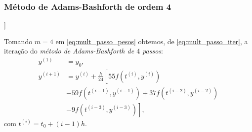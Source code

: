 \subsubsection{Método de Adams-Bashforth de ordem 4}

\begin{flushleft}
  [[tag:revisar]]
\end{flushleft}

Tomando $m=4$ em \eqref{eq:mult_passo_pesos} obtemos, de \eqref{eq:mult_passo_iter}, a iteração do \emph{método de Adams-Bashforth de $4$ passos}:
\begin{align}
  y^{(1)} &= y_0,\\
  y^{(i+1)} &= y^{(i)} + \frac{h}{24}\left[55f(t^{(i)},y^{(i)}) \right.\nonumber\\
              &\left. - 59f(t^{(i-1)},y^{(i-1)}) + 37f(t^{(i-2)},y^{(i-2)}) \right. \nonumber \\
          &\left. -9f(t^{(i-3)},y^{(i-3)})\right],
\end{align}
com $t^{(i)} = t_0 + (i-1)h$.

